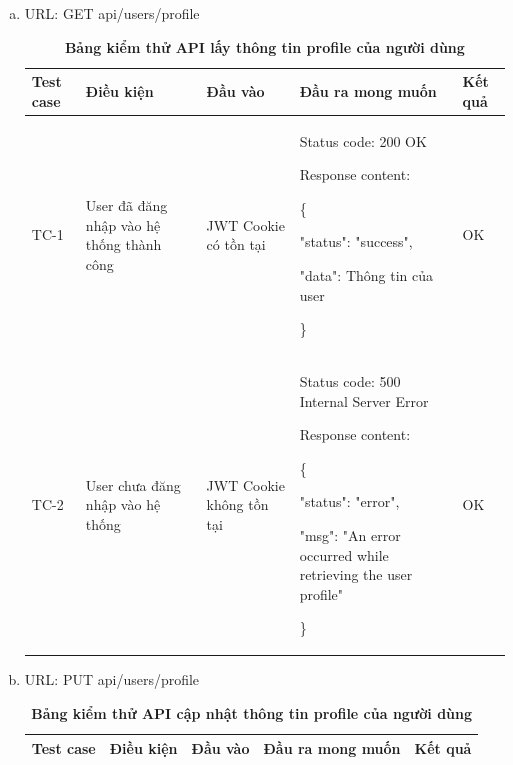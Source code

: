 \begin{enumerate}[a)]
  \item URL: GET api/users/profile 
  
  \begin{table}[H]
    \centering
    \caption{\bfseries \fontsize{12pt}{0pt}\selectfont Bảng kiểm thử API lấy thông tin profile của người dùng}
    \begin{tabularx}{\textwidth}{
    | >{\raggedright\arraybackslash}p{1cm}
    | >{\raggedright\arraybackslash}p{2cm}
    | >{\raggedright\arraybackslash}X
    | >{\raggedright\arraybackslash}X
    | >{\raggedright\arraybackslash}p{1cm}|
    }
    \hline
    \bfseries Test case    &\bfseries Điều kiện   &\bfseries Đầu vào 
    &\bfseries Đầu ra mong muốn &\bfseries Kết quả\\ \hline


    TC-1
    & User đã đăng nhập vào hệ thống thành công
    & JWT Cookie có tồn tại
    & 

    Status code: 200 OK

      Response content:

      \{

    "status": "success",

    "data": Thông tin của user

    \}
    
    & OK

    \\ \hline
  
    TC-2
    & User chưa đăng nhập vào hệ thống
    & JWT Cookie không tồn tại
    & 

    Status code: 500 Internal Server Error

      Response content:

      \{

    "status": "error",

    "msg": "An error occurred while retrieving the user profile"

    \}
    
    & OK

    \\ \hline
  
    \end{tabularx}
    \label{table_api_news}
  \end{table}
  
  \item URL: PUT api/users/profile
  
  \begin{table}[H]
    \centering
    \caption{\bfseries \fontsize{12pt}{0pt}\selectfont Bảng kiểm thử API cập nhật thông tin profile của người dùng}
    \begin{tabularx}{\textwidth}{
    | >{\raggedright\arraybackslash}p{1cm}
    | >{\raggedright\arraybackslash}p{2cm}
    | >{\raggedright\arraybackslash}X
    | >{\raggedright\arraybackslash}X
    | >{\raggedright\arraybackslash}p{1cm}|
    }
    \hline
    \bfseries Test case    &\bfseries Điều kiện   &\bfseries Đầu vào 
    &\bfseries Đầu ra mong muốn &\bfseries Kết quả\\ \hline



\end{tabularx}
\end{table}
\end{enumerate}
